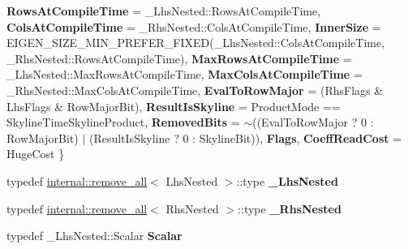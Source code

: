 \begin{DoxyCompactItemize}
\newline
{\bfseries Rows\+At\+Compile\+Time} = \+\_\+\+Lhs\+Nested\+:\+:Rows\+At\+Compile\+Time, 
{\bfseries Cols\+At\+Compile\+Time} = \+\_\+\+Rhs\+Nested\+:\+:Cols\+At\+Compile\+Time, 
{\bfseries Inner\+Size} = E\+I\+G\+E\+N\+\_\+\+S\+I\+Z\+E\+\_\+\+M\+I\+N\+\_\+\+P\+R\+E\+F\+E\+R\+\_\+\+F\+I\+X\+ED(\+\_\+\+Lhs\+Nested\+:\+:Cols\+At\+Compile\+Time, \+\_\+\+Rhs\+Nested\+:\+:Rows\+At\+Compile\+Time), 
{\bfseries Max\+Rows\+At\+Compile\+Time} = \+\_\+\+Lhs\+Nested\+:\+:Max\+Rows\+At\+Compile\+Time, 
\newline
{\bfseries Max\+Cols\+At\+Compile\+Time} = \+\_\+\+Rhs\+Nested\+:\+:Max\+Cols\+At\+Compile\+Time, 
{\bfseries Eval\+To\+Row\+Major} = (Rhs\+Flags \& Lhs\+Flags \& Row\+Major\+Bit), 
{\bfseries Result\+Is\+Skyline} = Product\+Mode == Skyline\+Time\+Skyline\+Product, 
{\bfseries Removed\+Bits} = $\sim$((Eval\+To\+Row\+Major ? 0 \+: Row\+Major\+Bit) $\vert$ (Result\+Is\+Skyline ? 0 \+: Skyline\+Bit)), 
\newline
{\bfseries Flags}, 
{\bfseries Coeff\+Read\+Cost} = Huge\+Cost
 \}
\item 
\mbox{\label{struct_eigen_1_1internal_1_1traits_3_01_skyline_product_3_01_lhs_nested_00_01_rhs_nested_00_01_product_mode_01_4_01_4_a7cd820114752d828b23f071f6df06cd5}} 
typedef \hyperlink{struct_eigen_1_1internal_1_1remove__all}{internal\+::remove\+\_\+all}$<$ Lhs\+Nested $>$\+::type {\bfseries \+\_\+\+Lhs\+Nested}
\item 
\mbox{\label{struct_eigen_1_1internal_1_1traits_3_01_skyline_product_3_01_lhs_nested_00_01_rhs_nested_00_01_product_mode_01_4_01_4_a64525519846ec366ea32cc7e0fcf589e}} 
typedef \hyperlink{struct_eigen_1_1internal_1_1remove__all}{internal\+::remove\+\_\+all}$<$ Rhs\+Nested $>$\+::type {\bfseries \+\_\+\+Rhs\+Nested}
\item 
\mbox{\label{struct_eigen_1_1internal_1_1traits_3_01_skyline_product_3_01_lhs_nested_00_01_rhs_nested_00_01_product_mode_01_4_01_4_abd68397c5d86944891e4b96e7da9361b}} 
typedef \+\_\+\+Lhs\+Nested\+::\+Scalar {\bfseries Scalar}

\end{DoxyCompactItemize}

